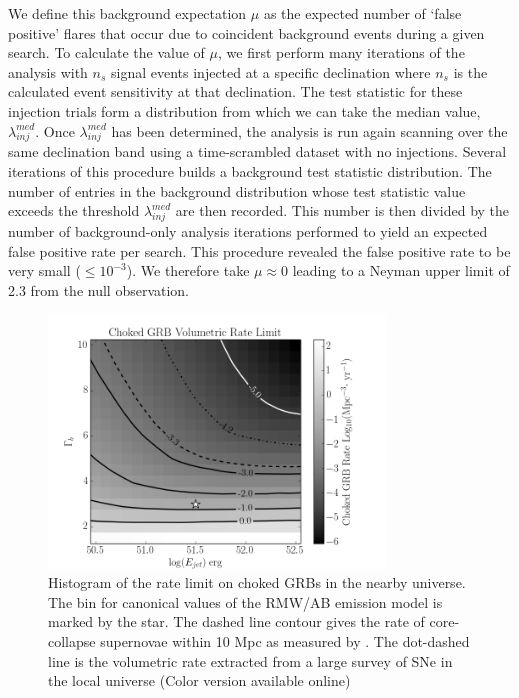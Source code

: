 \documentclass[manuscript]{aastex}
\begin{document}
We define this background expectation $\mu$ as the expected number of `false positive' flares that occur due to coincident background events during a given search. To calculate the value of $\mu$, we first perform many iterations of the analysis with $n_s$ signal events injected at a specific declination where $n_s$ is the calculated event sensitivity at that declination. The test statistic for these injection trials form a distribution from which we can take the median value, $\lambda_{inj}^{med}$. Once $\lambda_{inj}^{med}$ has been determined, the analysis is run again scanning over the same declination band using a time-scrambled dataset with no injections. Several iterations of this procedure builds a background test statistic distribution. The number of entries in the background distribution whose test statistic value exceeds the threshold $\lambda_{inj}^{med}$ are then recorded. This number is then divided by the number of background-only analysis iterations performed to yield an expected false positive rate per search. This procedure revealed the false positive rate to be very small ($\leq 10^{-3}$). We therefore take $\mu\approx0$ leading to a Neyman upper limit of 2.3 from the null observation.
\begin{figure}[ht]
  \begin{center}
    \includegraphics[width=0.8\textwidth,keepaspectratio]{plots/BW_RateLimit_2DHisto_wContours_SysAdjusted.png}
  \end{center}
  \caption[Choked GRB Volumetric Rate Limit]{Histogram of the rate limit on choked GRBs in the nearby universe. The bin for canonical values of the RMW/AB emission model is marked by the star. The dashed line contour gives the rate of core-collapse supernovae within 10 Mpc as measured by \cite{2011PhRvD..83l3008K}. The dot-dashed line is the volumetric rate extracted from a large survey of SNe in the local universe \citep{2011MNRAS.412.1419L} (Color version available online)}
  \label{fig:VolumetricRateSensitivity}
\end{figure}
\end{document}
